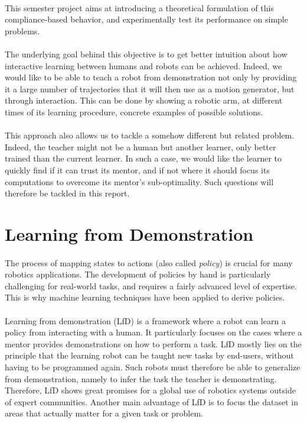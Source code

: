 \documentclass[a4paper]{report}
\begin{document}
{{			\paragraph{} This semester project aims at introducing a theoretical formulation of this compliance-based behavior, and experimentally test its performance on simple problems.
			
			\paragraph{} The underlying goal behind this objective is to get better intuition about how interactive learning between humans and robots can be achieved. Indeed, we would like to be able to teach a robot from demonstration not only by providing it a large number of trajectories that it will then use as a motion generator, but through interaction. This can be done by showing a robotic arm, at different times of its learning procedure, concrete examples of possible solutions. 
			
			\paragraph{} This approach also allows us to tackle a somehow different but related problem. Indeed, the teacher might not be a human but another learner, only better trained than the current learner. In such a case, we would like the learner to quickly find if it can trust its mentor, and if not where it should focus its computations to overcome its mentor's sub-optimality. Such questions will therefore be tackled in this report. 
		}
		\section{Learning from Demonstration}
		{	
			\label{subsection::lfd}
			\paragraph{} The process of mapping states to actions (also called \emph{policy}) is crucial for many robotics applications. The development of policies by hand is particularly challenging for real-world tasks, and requires a fairly advanced level of expertise. This is why machine learning techniques have been applied to derive policies.
			
			\paragraph{} Learning from demonstration (LfD) is a framework where a robot can learn a policy from interacting with a human. It particularly focuses on the cases where a mentor provides demonstrations on how to perform a task. LfD mostly lies on the principle that the learning robot can be taught new tasks by end-users, without having to be programmed again. Such robots must therefore be able to generalize from demonstration, namely to infer the task the teacher is demonstrating. Therefore, LfD shows great promises for a global use of robotics systems outside of expert communities. Another main advantage of LfD is to focus the dataset in areas that actually matter for a given task or problem. 
			
}}
\end{document}
